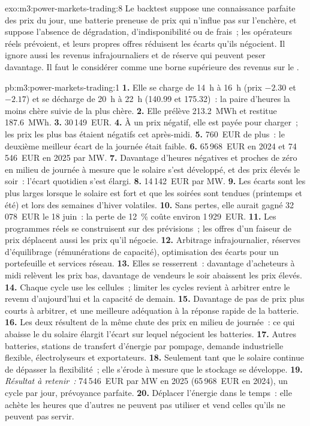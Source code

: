 \begin{solution}{exo:m3:power-markets-trading:8}
Le backtest suppose une connaissance parfaite des prix du jour, une batterie preneuse de prix qui
n'influe pas sur l'enchère, et suppose l'absence de dégradation, d'indisponibilité ou de frais~; les opérateurs réels prévoient, et leurs
propres offres réduisent les écarts qu'ils négocient. Il ignore aussi les revenus infrajournaliers et de réserve qui
peuvent peser davantage. Il faut le considérer comme une borne supérieure des revenus sur le .
\end{solution}

\begin{solution}{pb:m3:power-markets-trading:1}
\textbf{1.} Elle se charge de 14~h à 16~h (prix $-2.30$ et $-2.17$) et se décharge de 20~h
à 22~h (140.99 et 175.32)~: la paire d'heures la moins chère suivie de la plus chère.
\textbf{2.} Elle prélève 213.2~MWh et restitue 187.6~MWh. \textbf{3.} 30\,149~EUR. \textbf{4.} À un
prix négatif, elle est payée pour charger~; les prix les plus bas étaient négatifs cet après-midi.
\textbf{5.} 760~EUR de plus~: le deuxième meilleur écart de la journée était faible.
\textbf{6.} 65\,968~EUR en 2024 et 74\,546~EUR en 2025 par MW. \textbf{7.} Davantage d'heures négatives et
proches de zéro en milieu de journée à mesure que le solaire s'est développé, et des prix élevés le soir~: l'écart quotidien s'est élargi.
\textbf{8.} 14\,142~EUR par MW. \textbf{9.} Les écarts sont les plus larges lorsque le solaire est fort et que les soirées
sont tendues (printemps et été) et lors des semaines d'hiver volatiles. \textbf{10.} Sans pertes, elle aurait
gagné 32\,078~EUR le 18 juin~: la perte de 12~\% coûte environ 1\,929~EUR.
\textbf{11.} Les programmes réels se construisent sur des prévisions~; les offres d'un faiseur de prix déplacent aussi les prix qu'il
négocie. \textbf{12.} Arbitrage infrajournalier, réserves d'équilibrage (rémunérations de capacité), optimisation des
écarts pour un portefeuille et services réseau. \textbf{13.} Elles se resserrent~: davantage d'acheteurs à midi
relèvent les prix bas, davantage de vendeurs le soir abaissent les prix élevés. \textbf{14.} Chaque cycle
use les cellules~; limiter les cycles revient à arbitrer entre le revenu d'aujourd'hui et la capacité de demain. \textbf{15.} Davantage
de pas de prix plus courts à arbitrer, et une meilleure adéquation à la réponse rapide de la batterie.
\textbf{16.} Les deux résultent de la même chute des prix en milieu de journée~: ce qui abaisse le  du solaire
élargit l'écart sur lequel négocient les batteries. \textbf{17.} Autres batteries, stations de transfert d'énergie par pompage, demande industrielle flexible,
électrolyseurs et exportateurs. \textbf{18.} Seulement tant que le solaire continue de dépasser la flexibilité~;
elle s'érode à mesure que le stockage se développe. \textbf{19.} \emph{Résultat à retenir~:} 74\,546~EUR par MW en 2025
(65\,968~EUR en 2024), un cycle par jour, prévoyance parfaite. \textbf{20.} Déplacer l'énergie dans le temps~:
elle achète les heures que d'autres ne peuvent pas utiliser et vend celles qu'ils ne peuvent pas servir.
\end{solution}

